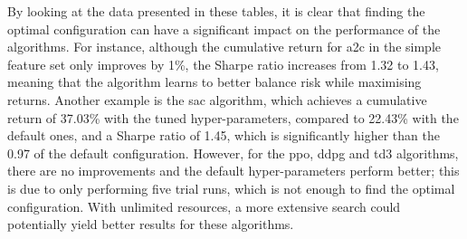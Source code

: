 


By looking at the data presented in these tables, it is clear that finding the optimal configuration can have a significant impact on the performance of the algorithms. For instance, although the cumulative return for \acrshort{a2c} in the simple feature set only improves by 1\%, the Sharpe ratio increases from 1.32 to 1.43, meaning that the algorithm learns to better balance risk while maximising returns. Another example is the \acrshort{sac} algorithm, which achieves a cumulative return of 37.03\% with the tuned hyper-parameters, compared to 22.43\% with the default ones, and a Sharpe ratio of 1.45, which is significantly higher than the 0.97 of the default configuration. However, for the \acrshort{ppo}, \acrshort{ddpg} and \acrshort{td3} algorithms, there are no improvements and the default hyper-parameters perform better; this is due to only performing five trial runs, which is not enough to find the optimal configuration. With unlimited resources, a more extensive search could potentially yield better results for these algorithms.

